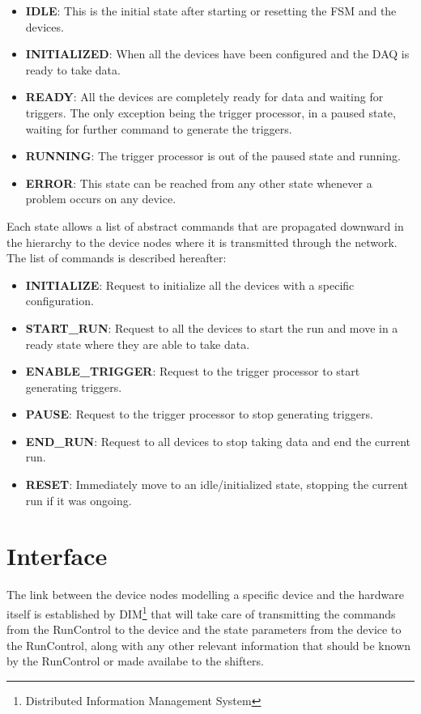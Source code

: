 \documentclass[a4paper]{article}
\begin{document}
\begin{itemize}
	\item \textbf{IDLE}: This is the initial state after starting or resetting the FSM and the devices.
	\item \textbf{INITIALIZED}: When all the devices have been configured and the DAQ is ready to take
	data.
	\item \textbf{READY}: All the devices are completely ready for data and waiting for triggers. The
	only exception being the trigger processor, in a paused state, waiting for further command to
	generate the triggers.
	\item \textbf{RUNNING}: The trigger processor is out of the paused state and running.
	\item \textbf{ERROR}: This state can be reached from any other state whenever a problem occurs on
	any device.
\end{itemize}

Each state allows a list of abstract commands that are propagated downward in the hierarchy to
the device nodes where it is transmitted through the network. The list of commands is described
hereafter:

\begin{itemize}
	\item \textbf{INITIALIZE}: Request to initialize all the devices with a specific configuration.
	\item \textbf{START\_RUN}: Request to all the devices to start the run and move in a ready state
	where they are able to take data.
	\item \textbf{ENABLE\_TRIGGER}: Request to the trigger processor to start generating triggers.
	\item \textbf{PAUSE}: Request to the trigger processor to stop generating triggers.
	\item \textbf{END\_RUN}: Request to all devices to stop taking data and end the current run.
	\item \textbf{RESET}: Immediately move to an idle/initialized state, stopping the current run if it
	was ongoing.
\end{itemize}

\section{Interface}
The link between the device nodes modelling a specific device and the hardware itself is
established by DIM\cite{biblio:DIM}\footnote{Distributed Information Management System} that will
take care of transmitting the commands from the RunControl to the device and the state parameters from the
device to the RunControl, along with any other relevant information that should be known by the
RunControl or made availabe to the shifters.
\end{document}
